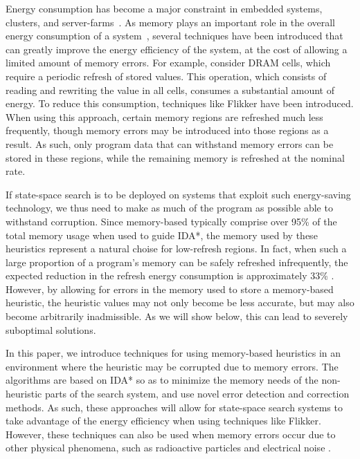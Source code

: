 \documentclass[letterpaper]{article}
\begin{document}
Energy consumption has become a major constraint in embedded systems, clusters, and server-farms~\cite{Cameron2005}. As memory plays an important role in the overall energy consumption of a system~\cite{5695550}, several techniques have been introduced that can greatly improve the energy efficiency of the system, at the cost of allowing a limited amount of memory errors. For example, consider DRAM cells, which require a periodic refresh of stored values. This operation, which consists of reading and rewriting the value in all cells, consumes a substantial amount of energy. To reduce this consumption, techniques like Flikker \cite{Liu:2011:FSD:1950365.1950391} have been introduced. When using this approach, certain memory regions are refreshed much less frequently, though memory errors may be introduced into those regions as a result. As such, only program data that can withstand memory errors can be stored in these regions, while the remaining memory is refreshed at the nominal rate. 

If state-space search is to be deployed on systems that exploit such energy-saving technology, we thus need to make as much of the program as possible able to withstand corruption. Since memory-based typically comprise over 95\% of the total memory usage when used to guide IDA*, the memory used by these heuristics represent a natural choise for low-refresh regions. In fact, when such a large proportion of a program's memory can be safely refreshed infrequently, the expected reduction in the refresh energy consumption is approximately 33\% \cite{Liu:2011:FSD:1950365.1950391}. However, by allowing for errors in the memory used to store a memory-based heuristic, the heuristic values may not only become be less accurate, but may also become arbitrarily inadmissible. As we will show below, this can lead to severely suboptimal solutions.

In this paper, we introduce techniques for using memory-based heuristics in an environment where the heuristic may be corrupted due to memory errors. The algorithms are based on IDA* so as to minimize the memory needs of the non-heuristic parts of the search system, and use novel error detection and correction methods. As such, these approaches will allow for state-space search systems to take advantage of the energy efficiency when using techniques like Flikker. However, these techniques can also be used when memory errors occur due to other physical phenomena, such as radioactive particles and electrical noise \cite{7266869}.
\end{document}
